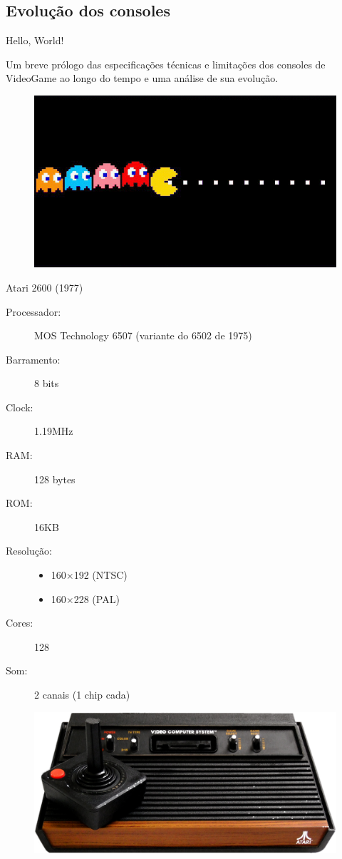 \documentclass{beamer}
\begin{document}
\begin{darkframes}
    \subsection{Evolução dos consoles}
    \begin{frame}{\huge Hello, World!}
        \begin{multicols}{2}
            Um breve prólogo das especificações técnicas e limitações dos consoles de
            VideoGame ao longo do tempo e uma análise de sua evolução.
            \begin{figure}[h!]
                \centering
                \includegraphics[width=.5\textwidth]{pacman}
            \end{figure}
        \end{multicols}
    \end{frame}

    \begin{frame}{Atari 2600 (1977)}
        \begin{multicols}{2}
            \begin{description}
                \item[Processador:] MOS Technology 6507 (variante do 6502 de 1975)
                \item[Barramento:] 8 bits
                \item[Clock:] 1.19MHz
                \item[RAM:] 128 bytes
                \item[ROM:] 16KB
                \item[Resolução:]
                    \begin{itemize}
                        \item 160$\times$192 (NTSC)
                        \item 160$\times$228 (PAL)
                    \end{itemize}
                \item[Cores:] 128
                \item[Som:] 2 canais (1 chip cada)
            \end{description}
        \end{multicols}
        \begin{figure}[h!]
            \centering
            \includegraphics[width=.5\textwidth]{Atari2600}
        \end{figure}
    \end{frame}


\end{darkframes}
\end{document}
